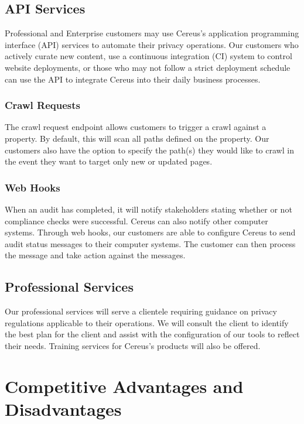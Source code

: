 \subsection{API Services}

Professional and Enterprise customers may use Cereus's application programming interface (API) services to automate their privacy operations. Our customers who actively curate new content, use a continuous integration (CI) system to control website deployments, or those who may not follow a strict deployment schedule can use the API to integrate Cereus into their daily business processes.

\subsubsection*{Crawl Requests}

The crawl request endpoint allows customers to trigger a crawl against a property. By default, this will scan all paths defined on the property. Our customers also have the option to specify the path(s) they would like to crawl in the event they want to target only new or updated pages.

\subsubsection*{Web Hooks}

When an audit has completed, it will notify stakeholders stating whether or not compliance checks were successful. Cereus can also notify other computer systems. Through web hooks, our customers are able to configure Cereus to send audit status messages to their computer systems. The customer can then process the message and take action against the messages.

\subsection{Professional Services}

Our professional services will serve a clientele requiring guidance on privacy regulations applicable to their operations. We will consult the client to identify the best plan for the client and assist with the configuration of our tools to reflect their needs. Training services for Cereus's products will also be offered.

\section{Competitive Advantages and Disadvantages}

